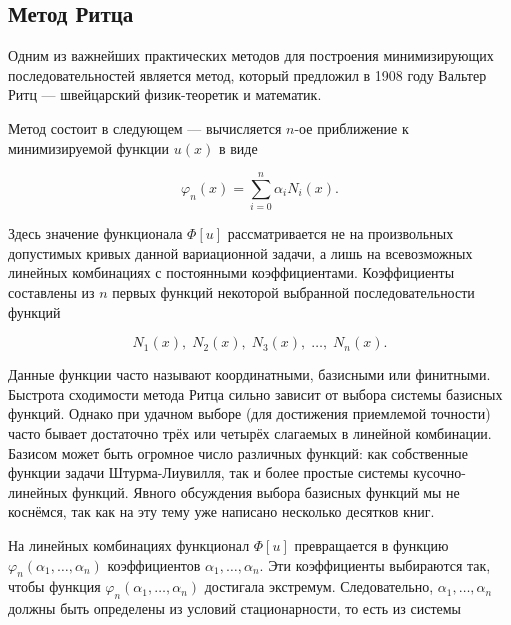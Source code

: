 \documentclass{article}
\begin{document}

\subsection{Метод Ритца}

Одним из важнейших практических методов для построения минимизирующих последовательностей является метод, который предложил в 1908 году Вальтер Ритц --- швейцарский физик-теоретик и математик.

Метод состоит в следующем --- вычисляется $n$-ое приближение к минимизируемой функции $u(x)$ в виде

\begin{displaymath}
	\varphi_{n}(x) = \sum_{i=0}^n \alpha_{i} N_{i}(x).
\end{displaymath}

\noindent Здесь значение функционала $\Phi[u]$ рассматривается не на произвольных допустимых кривых данной вариационной задачи, а лишь на всевозможных линейных комбинациях с постоянными коэффициентами. Коэффициенты составлены из $n$ первых функций некоторой выбранной последовательности функций

\begin{displaymath}
	N_{1}(x), \; N_{2}(x), \; N_{3}(x), \; \ldots, \; N_{n}(x).
\end{displaymath}

\begin{info}
	Данные функции часто называют координатными, базисными или финитными. Быстрота сходимости метода Ритца сильно зависит от выбора системы базисных функций. Однако при удачном выборе (для достижения приемлемой точности) часто бывает достаточно трёх или четырёх слагаемых в линейной комбинации. Базисом может быть огромное число различных функций: как собственные функции задачи Штурма-Лиувилля, так и более простые системы кусочно-линейных функций. Явного обсуждения выбора базисных функций мы не коснёмся, так как на эту тему уже написано несколько десятков книг.
\end{info}

На линейных комбинациях функционал $\Phi[u]$ превращается в функцию $\varphi_{n}(\alpha_{1}, \ldots, \alpha_{n})$ коэффициентов $\alpha_{1}, \ldots, \alpha_{n}$. Эти коэффициенты выбираются так, чтобы функция $\varphi_{n}(\alpha_{1}, \ldots, \alpha_{n})$ достигала экстремум. Следовательно, $\alpha_{1}, \ldots, \alpha_{n}$ должны быть определены из условий стационарности, то есть из системы
\end{document}
